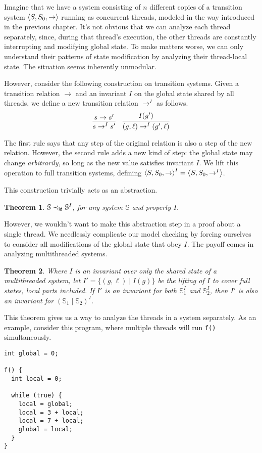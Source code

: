 \documentclass{amsbook}
\newtheorem{theorem}{Theorem}[chapter]
\theoremstyle{definition}
\theoremstyle{remark}
\numberwithin{section}{chapter}
\numberwithin{equation}{chapter}
\begin{document}
Imagine that we have a system consisting of $n$ different copies of a transition system ${\left \langle S, S_0, \to \right \rangle}$ running as concurrent threads, modeled in the way introduced in the previous chapter.
It's not obvious that we can analyze each thread separately, since, during that thread's execution, the other threads are constantly interrupting and modifying global state.
To make matters worse, we can only understand their patterns of state modification by analyzing their thread-local state.
The situation seems inherently unmodular.

However, consider the following construction on transition systems.
Given a transition relation $\to$ and an invariant $I$ on the global state shared by all threads, we define a new transition relation $\to^I$ as follows.
$$\infer{s \to^I s'}{
  s \to s'
}
\quad \infer{(g, \ell) \to^I (g', \ell)}{
  I(g')
}$$

The first rule says that any step of the original relation is also a step of the new relation.
However, the second rule adds a new kind of step: the global state may change \emph{arbitrarily}, so long as the new value satisfies invariant $I$.
We lift this operation to full transition systems, defining ${\left \langle S, S_0, \to \right \rangle}^I = {\left \langle S, S_0, \to^I \right \rangle}$.

This construction trivially acts as an abstraction.
\begin{theorem}\label{shared_invariant_abstract}
  \abstraction
  $\mathbb S \prec_\mathsf{id} {\mathbb S}^I$, for any system $\mathbb S$ and property $I$.
\end{theorem}

\newcommand{\modularity}[0]{\marginpar{\fbox{\textbf{Modularity}}}}

However, we wouldn't want to make this abstraction step in a proof about a single thread.
We needlessly complicate our model checking by forcing ourselves to consider all modifications of the global state that obey $I$.
The payoff comes in analyzing multithreaded systems.
\begin{theorem}\label{shared_invariant_modular}
  \modularity
  Where $I$ is an invariant over only the shared state of a multithreaded system, let $I' = \{(g, \ell) \mid I(g)\}$ be the lifting of $I$ to cover full states, local parts included.  If $I'$ is an invariant for both ${\mathbb S}_1^I$ and ${\mathbb S}_2^I$, then $I'$ is also an invariant for $({\mathbb S}_1 \mid {\mathbb S}_2)^I$.
\end{theorem}

This theorem gives us a way to analyze the threads in a system separately.
As an example, consider this program, where multiple threads will run \texttt{f()} simultaneously.
\begin{verbatim}
int global = 0;

f() {
  int local = 0;

  while (true) {
    local = global;
    local = 3 + local;
    local = 7 + local;
    global = local;
  }
}
\end{verbatim}
\end{document}
